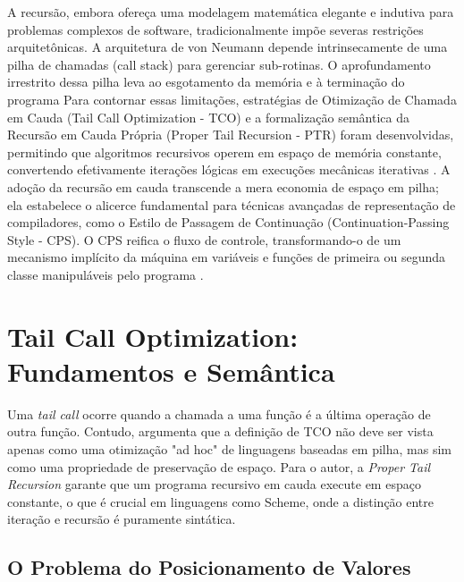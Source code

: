 \documentclass[12pt, a4paper]{article}
\begin{document}
A recursão, embora ofereça uma modelagem matemática elegante e indutiva para problemas complexos de software, tradicionalmente impõe severas restrições arquitetônicas. A arquitetura de von Neumann depende intrinsecamente de uma pilha de chamadas (call stack) para gerenciar sub-rotinas. O aprofundamento irrestrito dessa pilha leva ao esgotamento da memória e à terminação do programa \autocite{insa2015}  Para contornar essas limitações, estratégias de Otimização de Chamada em Cauda (Tail Call Optimization - TCO) e a formalização semântica da Recursão em Cauda Própria (Proper Tail Recursion - PTR) foram desenvolvidas, permitindo que algoritmos recursivos operem em espaço de memória constante, convertendo efetivamente iterações lógicas em execuções mecânicas iterativas \autocite{malkov2026}.   A adoção da recursão em cauda transcende a mera economia de espaço em pilha; ela estabelece o alicerce fundamental para técnicas avançadas de representação de compiladores, como o Estilo de Passagem de Continuação (Continuation-Passing Style - CPS). O CPS reifica o fluxo de controle, transformando-o de um mecanismo implícito da máquina em variáveis e funções de primeira ou segunda classe manipuláveis pelo programa \autocite{clinger1998}.

\section{Tail Call Optimization: Fundamentos e Semântica}

Uma \textit{tail call} ocorre quando a chamada a uma função é a última operação de outra função. Contudo, \autocite{clinger1998} argumenta que a definição de TCO não deve ser vista apenas como uma otimização "ad hoc" de linguagens baseadas em pilha, mas sim como uma propriedade de preservação de espaço. Para o autor, a \textit{Proper Tail Recursion} garante que um programa recursivo em cauda execute em espaço constante, o que é crucial em linguagens como Scheme, onde a distinção entre iteração e recursão é puramente sintática.

\subsection{O Problema do Posicionamento de Valores}
\end{document}
